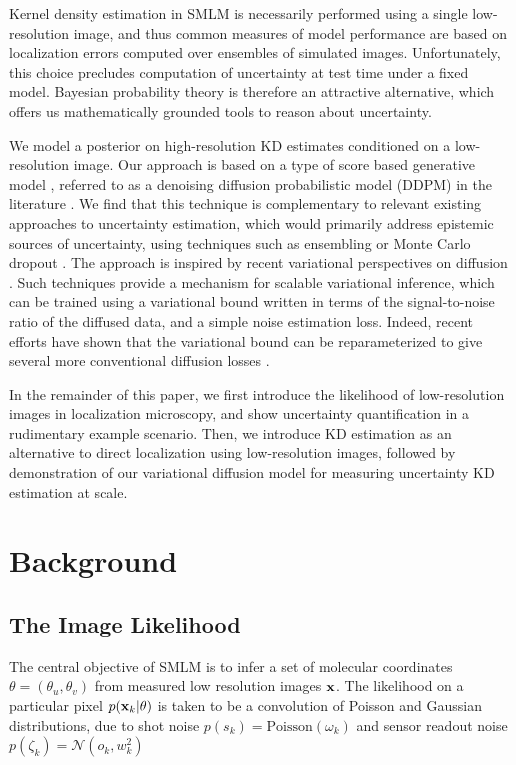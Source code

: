 \documentclass{article}
\begin{document}
Kernel density estimation in SMLM is necessarily performed using a single low-resolution image, and thus common measures of model performance are based on localization errors computed over ensembles of simulated images. Unfortunately, this choice precludes computation of uncertainty at test time under a fixed model. Bayesian probability theory is therefore an attractive alternative, which offers us mathematically grounded tools to reason about uncertainty. 

We model a posterior on high-resolution KD estimates conditioned on a low-resolution image. Our approach is based on a type of score based generative model \citep{Song2021}, referred to as a denoising diffusion probabilistic model (DDPM) in the literature \citep{Ho2020,Song2021}. We find that this technique is complementary to relevant existing approaches to uncertainty estimation, which would primarily address epistemic sources of uncertainty, using techniques such as ensembling \citep{Lakshminarayanan2017} or Monte Carlo dropout \citep{Gal2022}. The approach is inspired by recent variational perspectives on diffusion \citep{Dirmeier2023,Ribeiro2024,Kingma2021,Kingma2023}.  Such techniques provide a mechanism for scalable variational inference, which can be trained using a variational bound written in terms of the signal-to-noise ratio of the diffused data, and a simple noise estimation loss. Indeed, recent efforts have shown that the variational bound can be reparameterized to give several more conventional diffusion losses \citep{Kingma2021,Kingma2023,Ribeiro2024}. 

In the remainder of this paper, we first introduce the likelihood of low-resolution images in localization microscopy, and show uncertainty quantification in a rudimentary example scenario. Then, we introduce KD estimation as an alternative to direct localization using low-resolution images, followed by demonstration of our variational diffusion model for measuring uncertainty KD estimation at scale. 

\section{Background}

\subsection{The Image Likelihood}

The central objective of SMLM is to infer a set of molecular coordinates $\theta=(\theta_{u},\theta_{v})$ from measured low resolution images $\bold{x}$. The likelihood on a particular pixel $p(\bold{x}_k|\theta)$ is taken to be a convolution of Poisson and Gaussian distributions, due to shot noise $p(s_{k}) = \mathrm{Poisson}(\omega_{k})$ and sensor readout noise $p(\zeta_{k}) = \mathcal{N}(o_{k},w_{k}^{2})$ 
\end{document}
